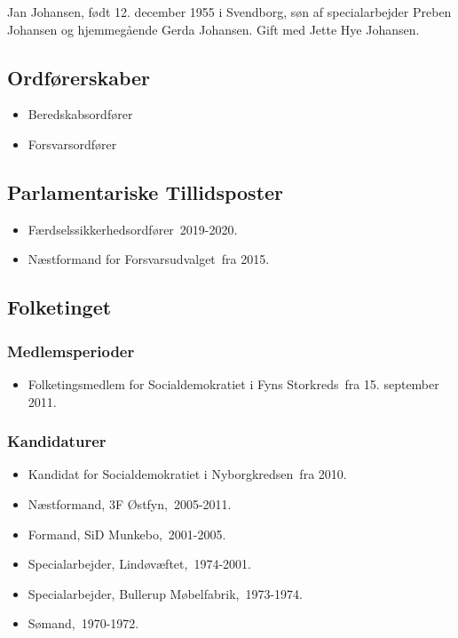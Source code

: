 \documentclass[11pt, a4paper]{awesome-cv}
\begin{document}
\makecvheader[R]
\makelettertitle
\begin{cvletter}
Jan Johansen, født 12. december 1955 i Svendborg, søn af specialarbejder Preben Johansen og hjemmegående Gerda Johansen. Gift med Jette Hye Johansen.

\subsection*{Ordførerskaber}
\begin{itemize}
\item Beredskabsordfører
\item Forsvarsordfører
\end{itemize}
\subsection*{Parlamentariske Tillidsposter}
\begin{itemize}
\item Færdselssikkerhedsordfører 2019-2020.
\item Næstformand for Forsvarsudvalget fra 2015.
\end{itemize}
\subsection*{Folketinget}
\subsubsection*{Medlemsperioder}
\begin{itemize}
\item Folketingsmedlem for Socialdemokratiet i Fyns Storkreds fra 15. september 2011.
\end{itemize}
\subsubsection*{Kandidaturer}
\begin{itemize}
\item Kandidat for Socialdemokratiet i Nyborgkredsen fra 2010.
\end{itemize}
\begin{itemize}
\item Næstformand, 3F Østfyn, 2005-2011.
\item Formand, SiD Munkebo, 2001-2005.
\item Specialarbejder, Lindøvæftet, 1974-2001.
\item Specialarbejder, Bullerup Møbelfabrik, 1973-1974.
\item Sømand, 1970-1972.
\end{itemize}
\end{cvletter}
\end{document}
